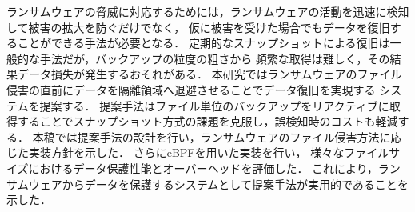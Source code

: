 ランサムウェアの脅威に対応するためには，ランサムウェアの活動を迅速に検知して被害の拡大を防ぐだけでなく，
仮に被害を受けた場合でもデータを復旧することができる手法が必要となる．
定期的なスナップショットによる復旧は一般的な手法だが，バックアップの粒度の粗さから
頻繁な取得は難しく，その結果データ損失が発生するおそれがある．
本研究ではランサムウェアのファイル侵害の直前にデータを隔離領域へ退避させることでデータ復旧を実現する
システムを提案する．
提案手法はファイル単位のバックアップをリアクティブに取得することでスナップショット方式の課題を克服し，誤検知時のコストも軽減する．
本稿では提案手法の設計を行い，ランサムウェアのファイル侵害方法に応じた実装方針を示した．
さらにeBPFを用いた実装を行い，
様々なファイルサイズにおけるデータ保護性能とオーバーヘッドを評価した．
これにより，ランサムウェアからデータを保護するシステムとして提案手法が実用的であることを示した．
